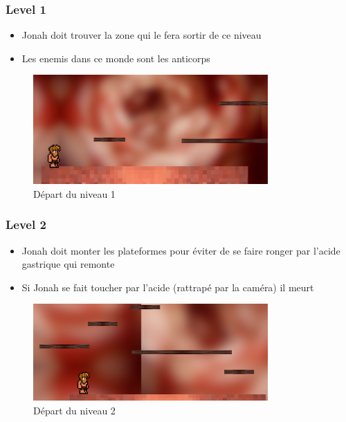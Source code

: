 \documentclass{prologArticle}
\begin{document}
\subsubsection{Level 1}
\begin{itemize}
    \item Jonah doit trouver la zone qui le fera sortir de ce niveau
    \item Les enemis dans ce monde sont les anticorps
\end{itemize}

\begin{figure}[H]
    \centering
    \includegraphics[width=0.8\textwidth]{res/level1.png}
    \caption{Départ du niveau 1}
\end{figure}

\subsubsection{Level 2}

\begin{itemize}
    \item Jonah doit monter les plateformes pour éviter de se faire ronger par l'acide gastrique qui remonte
    \item Si Jonah se fait toucher par l'acide (rattrapé par la caméra) il meurt
\end{itemize}

\begin{figure}[H]
    \centering
    \includegraphics[width=0.8\textwidth]{res/level2.png}
    \caption{Départ du niveau 2}
\end{figure}
\end{document}

